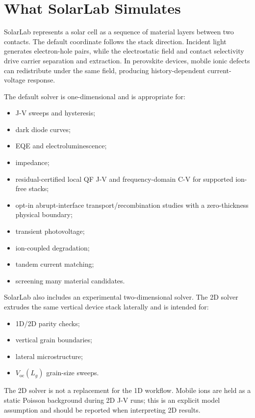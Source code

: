 \documentclass[
  11pt,
  american,
]{report}
\providecommand{\tightlist}{%
  \setlength{\itemsep}{0pt}\setlength{\parskip}{0pt}}
\begin{document}
\hypertarget{what-solarlab-simulates}{%
\chapter{What SolarLab Simulates}\label{what-solarlab-simulates}}

SolarLab represents a solar cell as a sequence of material layers
between two contacts. The default coordinate follows the stack
direction. Incident light generates electron-hole pairs, while the
electrostatic field and contact selectivity drive carrier separation and
extraction. In perovskite devices, mobile ionic defects can redistribute
under the same field, producing history-dependent current-voltage
response.

The default solver is one-dimensional and is appropriate for:

\begin{itemize}
\tightlist
\item
  J-V sweeps and hysteresis;
\item
  dark diode curves;
\item
  EQE and electroluminescence;
\item
  impedance;
\item
  residual-certified local QF J-V and frequency-domain C-V for supported
  ion-free stacks;
\item
  opt-in abrupt-interface transport/recombination studies with a
  zero-thickness physical boundary;
\item
  transient photovoltage;
\item
  ion-coupled degradation;
\item
  tandem current matching;
\item
  screening many material candidates.
\end{itemize}

SolarLab also includes an experimental two-dimensional solver. The 2D
solver extrudes the same vertical device stack laterally and is intended
for:

\begin{itemize}
\tightlist
\item
  1D/2D parity checks;
\item
  vertical grain boundaries;
\item
  lateral microstructure;
\item
  \(V_\mathrm{oc}(L_g)\) grain-size sweeps.
\end{itemize}

The 2D solver is not a replacement for the 1D workflow. Mobile ions are
held as a static Poisson background during 2D J-V runs; this is an
explicit model assumption and should be reported when interpreting 2D
results.
\end{document}
